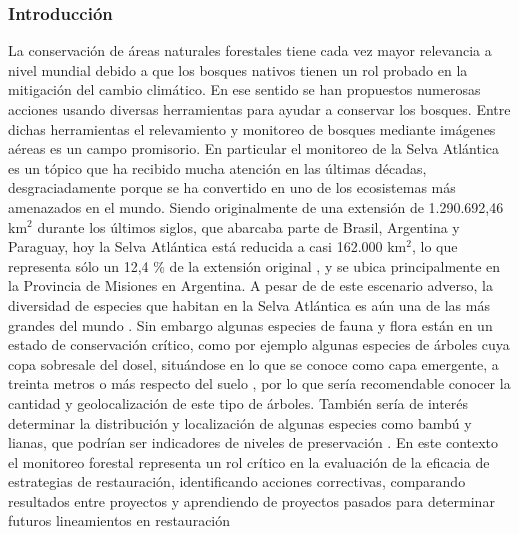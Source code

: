 \subsubsection{Introducción}
La conservación de áreas naturales forestales tiene cada vez mayor relevancia a nivel mundial debido a que los bosques nativos tienen un rol probado en la mitigación del cambio climático. En ese sentido se han propuestos numerosas acciones usando diversas herramientas para ayudar a conservar los bosques. Entre dichas herramientas el relevamiento y monitoreo de bosques mediante imágenes aéreas es un campo promisorio. En particular el monitoreo de la Selva Atlántica es un tópico que ha recibido mucha atención en las últimas décadas, desgraciadamente porque se ha convertido en uno de los ecosistemas más amenazados en el mundo. Siendo originalmente de una extensión de 1.290.692,46 km$^2$ durante los últimos siglos, que abarcaba parte de Brasil, Argentina y Paraguay, hoy la Selva Atlántica está reducida a casi 162.000 km$^2$, lo que representa sólo un 12,4 \% de la extensión original \cite{de_lima_erosion_2020}, y se ubica principalmente en la Provincia de Misiones en Argentina. A pesar de de este escenario adverso, la diversidad de especies que habitan en la Selva Atlántica es aún una de las más grandes del mundo \cite{lima_how_2015}. Sin embargo algunas especies de fauna y flora están en un estado de conservación crítico, como por ejemplo algunas especies de árboles cuya copa sobresale del dosel, situándose en lo que se conoce como capa emergente, a treinta metros o más respecto del suelo \cite{noauthor_rainforest_2015}, por lo que sería recomendable conocer la cantidad y geolocalización de este tipo de árboles. También sería de interés determinar la distribución y localización de algunas especies como bambú y lianas, que podrían ser indicadores de niveles de preservación \cite{bedrij_selective_2022}. En este contexto el monitoreo forestal representa un rol crítico en la evaluación de la eficacia de estrategias de restauración, identificando acciones correctivas, comparando resultados entre proyectos y aprendiendo de proyectos pasados para determinar futuros lineamientos en restauración \cite{viani_protocol_2017}
